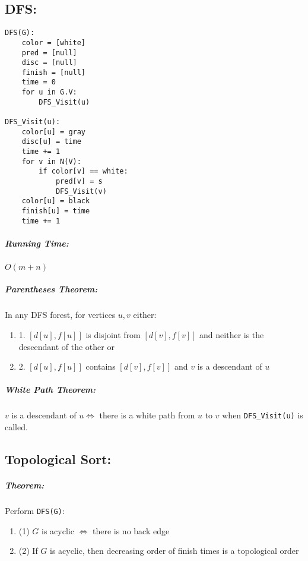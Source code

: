 \documentclass{article}
\newcommand{\code}[1]{\texttt{#1}}
\begin{document}
\subsection*{DFS:}
\begin{lstlisting}
DFS(G):
    color = [white]
    pred = [null]
    disc = [null]
    finish = [null]
    time = 0
    for u in G.V:
        DFS_Visit(u)

DFS_Visit(u):
    color[u] = gray
    disc[u] = time
    time += 1
    for v in N(V):
        if color[v] == white:
            pred[v] = s
            DFS_Visit(v)
    color[u] = black
    finish[u] = time
    time += 1
\end{lstlisting}

\subparagraph*{Running Time:} \(O(m + n)\)

\subparagraph*{Parentheses Theorem:} In any DFS forest, for vertices \(u, v\) either:
\begin{enumerate}
    \item[] 1. \([d[u],f[u]]\) is disjoint from \([d[v],f[v]]\) and neither is the descendant of the other or
    \item[] 2. \([d[u],f[u]]\) contains \([d[v],f[v]]\) and \(v\) is a descendant of \(u\)
\end{enumerate}

\subparagraph*{White Path Theorem:} \(v\) is a descendant of \(u \iff\) there is a white path from \(u\) to \(v\) when \code{DFS\_Visit(u)} is called.

\subsection*{Topological Sort:}
\subparagraph*{Theorem:} Perform \code{DFS(G)}:
\begin{enumerate}
    \item[] (1) \(G\) is acyclic \(\iff\) there is no back edge
    \item[] (2) If \(G\) is acyclic, then decreasing order of finish times is a topological order
\end{enumerate}
\end{document}
